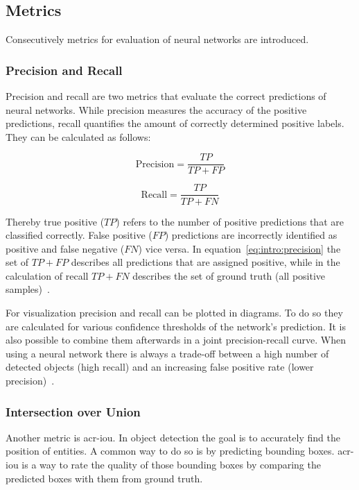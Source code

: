 \subsection{Metrics}\label{subsec:intro:metrics}

Consecutively metrics for evaluation of neural networks are introduced.

\subsubsection*{Precision and Recall}

Precision and recall are two metrics that evaluate the correct predictions of neural networks. While 
precision measures the accuracy of the positive predictions, recall quantifies the amount of correctly 
determined positive labels. They can be calculated as follows: 

\begin{equation}
	\label{eq:intro:precision}
	\text{Precision} = \frac{TP}{TP + FP}
\end{equation}

\begin{equation}
	\label{eq:intro:recall}
	\text{Recall} = \frac{TP}{TP + FN}
\end{equation}

Thereby true positive ($TP$) refers to the number of positive predictions that are classified 
correctly. False positive ($FP$) predictions are incorrectly identified as positive and false negative 
($FN$) vice versa. In equation~\ref{eq:intro:precision} the set of $TP + FP$ describes all predictions 
that are assigned positive, while in the calculation of recall $TP + FN$ describes the set of ground 
truth (all positive samples)~\cite{terven2023, zheng2022}. 

For visualization precision and recall can be plotted in diagrams. To do so they are calculated 
for various confidence thresholds of the network's prediction. It is also possible to combine them 
afterwards in a joint precision-recall curve. When using a neural network there is always a 
trade-off between a high number of detected objects (high recall) and an increasing false positive 
rate (lower precision)~\cite{terven2023}.

\subsubsection*{Intersection over Union}

Another metric is \gls{acr-iou}. In object detection the goal is to accurately find the position of 
entities. A common way to do so is by predicting bounding boxes. \gls{acr-iou} is a way to rate the 
quality of those bounding boxes by comparing the predicted boxes with them from ground truth.

